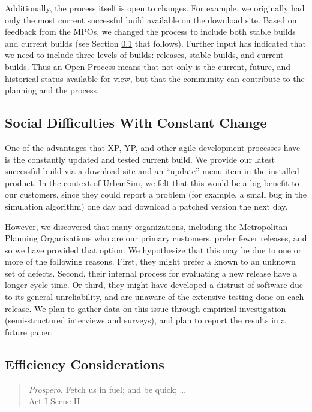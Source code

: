 \documentclass[times, 10pt,twocolumn]{article}
\begin{document}
Additionally, the process itself is open to changes. For example, we originally
had only the most current successful build available on the download site.
Based on feedback from the MPOs, we changed the process to include both
stable builds and current builds
(see Section \ref{constant-change} that follows).
Further input has indicated that we need
to include three levels of builds: releases, stable builds, and current builds.
Thus an Open Process means that not only is the current, future, and
historical status available for view, but that the community can contribute
to the planning and the process.

\subsection{Social Difficulties With Constant Change}
\label{constant-change}

One of the advantages that XP, YP, and other agile development processes
have is the constantly updated and tested current build.  We provide our
latest successful build via a download site and an ``update'' menu item in
the installed product.  In the context of UrbanSim, we felt that this would
be a big benefit to our customers, since they could report a problem (for
example, a small bug in the simulation algorithm) one day and download a
patched version the next day.

However, we discovered that many organizations, including the Metropolitan
Planning Organizations who are our primary customers, prefer fewer
releases, and so we have provided that option.  We hypothesize that this
may be due to one or more of the following reasons.  First, they might
prefer a known to an unknown set of defects.  Second, their
internal process for evaluating a new release have a longer cycle time.  Or
third, they might have developed a distrust of software due to its general
unreliability, and are unaware of the extensive testing done on each
release.  We plan to gather data on this issue through empirical
investigation (semi-structured interviews and surveys), and plan to
report the results in a future paper.

\subsection{Efficiency Considerations}
\label{efficiency}

\begin{quote}
\emph{Prospero.}
Fetch us in fuel; and be quick; \ldots \\
\hspace*{1cm} Act I Scene II
\end{quote}
\end{document}
